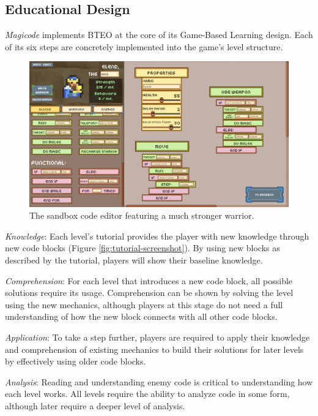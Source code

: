 \documentclass[10pt,twocolumn]{article}
\begin{document}
\subsection{Educational Design}
\textit{Magicode} implements BTEO at the core of its Game-Based Learning design. Each of its six steps are concretely implemented into the game’s level structure.

\begin{figure}
    \centering
    \includegraphics[width=\linewidth]{images/screenshots/elend_editor.png}
    \caption{The sandbox code editor featuring a much stronger warrior.}
    \label{fig:sandbox-warrior-screenshot}
\end{figure}

\textit{Knowledge}: Each level’s tutorial provides the player with new knowledge through new code blocks (Figure \ref{fig:tutorial-screenshot}). By using new blocks as described by the tutorial, players will show their baseline knowledge.


\textit{Comprehension}: For each level that introduces a new code block, all possible solutions require its usage. Comprehension can be shown by solving the level using the new mechanics, although players at this stage do not need a full understanding of how the new block connects with all other code blocks.

\textit{Application}: To take a step further, players are required to apply their knowledge and comprehension of existing mechanics to build their solutions for later levels by effectively using older code blocks.

\textit{Analysis}: Reading and understanding enemy code is critical to understanding how each level works. All levels require the ability to analyze code in some form, although later require a deeper level of analysis.
\end{document}
